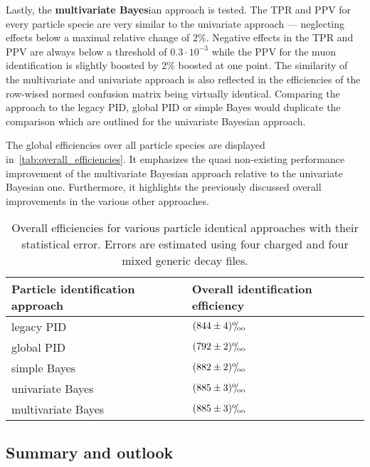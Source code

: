 Lastly, the \textbf{multivariate Bayes}ian approach is tested. The TPR and PPV for every particle specie are very similar to the univariate approach --- neglecting effects below a maximal relative change of $2 \%$. Negative effects in the TPR and PPV are always below a threshold of $0.3 \cdot 10^{-3}$ while the PPV for the muon identification is slightly boosted by $2 \%$ boosted at one point.
The similarity of the multivariate and univariate approach is also reflected in the efficiencies of the row-wised normed confusion matrix being virtually identical. Comparing the approach to the legacy PID, global PID or simple Bayes would duplicate the comparison which are outlined for the univariate Bayesian approach.

The global efficiencies over all particle species are displayed in~\autoref{tab:overall_efficiencies}. It emphasizes the quasi non-existing performance improvement of the multivariate Bayesian approach relative to the univariate Bayesian one. Furthermore, it highlights the previously discussed overall improvements in the various other approaches.

\begin{table}[ht]
	\centering
	\begin{tabular}{l|l}
		Particle identification approach & Overall identification efficiency \\
		\hline
		legacy PID & $(844 \pm 4) {}^\text{o}\mkern-5mu/\mkern-3mu_\text{oo}$ \\ %
		global PID & $(792 \pm 2) {}^\text{o}\mkern-5mu/\mkern-3mu_\text{oo}$ \\ %
		simple Bayes & $(882 \pm 2) {}^\text{o}\mkern-5mu/\mkern-3mu_\text{oo}$ \\ %
		univariate Bayes & $(885 \pm 3) {}^\text{o}\mkern-5mu/\mkern-3mu_\text{oo}$ \\ %
		multivariate Bayes & $(885 \pm 3) {}^\text{o}\mkern-5mu/\mkern-3mu_\text{oo}$ %
	\end{tabular}
	\caption{Overall efficiencies for various particle identical approaches with their statistical error. Errors are estimated using four charged and four mixed generic decay files.}
	\label{tab:overall_efficiencies}
\end{table}

\subsection{Summary and outlook}
\label{subsc:bayesian_approach_summary}

